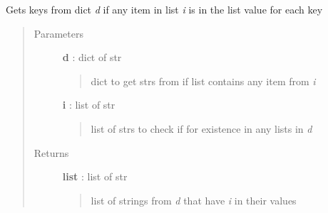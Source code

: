 \documentclass[letterpaper,10pt,english]{sphinxmanual}
\begin{document}
\begin{fulllineitems}
\label{pytan.utils:pytan.utils.get_dict_list_items}
Gets keys from dict \emph{d} if any item in list \emph{i} is in the list value for each key
\begin{quote}\begin{description}
\item[{Parameters}] \leavevmode
\textbf{d} : dict of str
\begin{quote}

dict to get strs from if list contains any item from \emph{i}
\end{quote}

\textbf{i} : list of str
\begin{quote}

list of strs to check if for existence in any lists in \emph{d}
\end{quote}

\item[{Returns}] \leavevmode
\textbf{list} : list of str
\begin{quote}

list of strings from \emph{d} that have \emph{i} in their values
\end{quote}

\end{description}\end{quote}

\end{fulllineitems}

\end{document}
